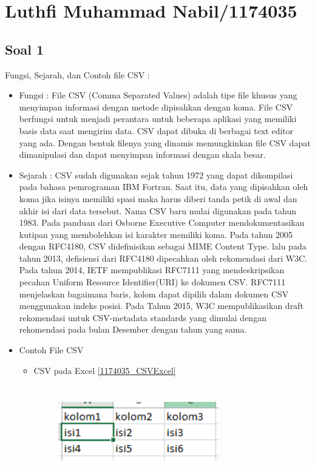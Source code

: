 \section{Luthfi Muhammad Nabil/1174035}
\subsection{Soal 1}
Fungsi, Sejarah, dan Contoh file CSV : 
\begin{itemize}
	\item Fungsi : 
	File CSV (Comma Separated Values) adalah tipe file khusus yang menyimpan informasi dengan metode dipisahkan dengan koma. File CSV berfungsi untuk menjadi perantara untuk beberapa aplikasi yang memiliki basis data saat mengirim data. CSV dapat dibuka di berbagai text editor
	yang ada. Dengan bentuk filenya yang dinamis memungkinkan file CSV dapat dimanipulasi dan dapat menyimpan informasi dengan skala besar.
	\item Sejarah :
	CSV sudah digunakan sejak tahun 1972 yang dapat dikompilasi pada bahasa pemrograman IBM Fortran. Saat itu, data yang dipisahkan oleh koma jika isinya memiliki spasi maka harus diberi tanda petik di awal dan akhir isi dari data tersebut. Nama CSV baru mulai digunakan pada tahun 1983. Pada panduan dari Osborne Executive Computer mendokumentasikan kutipan yang membolehkan isi karakter memiliki koma.  Pada tahun 2005 dengan RFC4180, CSV didefinisikan sebagai MIME Content Type. lalu pada tahun 2013, defisiensi dari RFC4180 dipecahkan oleh rekomendasi dari W3C. Pada tahun 2014, IETF mempublikasi RFC7111 yang mendeskripsikan pecahan Uniform Resource Identifier(URI) ke dokumen CSV. RFC7111 menjelaskan bagaimana baris, kolom dapat dipilih dalam dokumen CSV menggunakan indeks posisi. Pada Tahun 2015, W3C mempublikasikan draft rekomendasi untuk CSV-metadata standards yang dimulai dengan rekomendasi pada bulan Desember dengan tahun yang sama. 
	\item Contoh File CSV \begin{itemize}
							\item 
							CSV pada Excel \ref{1174035_CSVExcel}
							\begin{figure}[!htbp]
								\centering
								\includegraphics[height=4cm, width=7cm]{figures/4/1174035/Teori/1174035_CSVExcel.jpg}

\end{figure}
\end{itemize}
\end{itemize}
